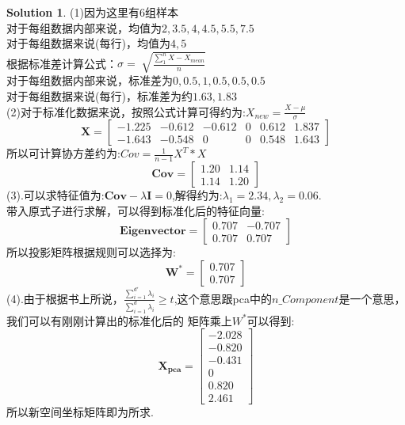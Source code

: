 \documentclass[a4paper,UTF8]{article}
\numberwithin{equation}{section}
\theoremstyle{definition}
\newtheorem*{solution}{Solution}
\def \X {\mathbf{X}}
\begin{document}
\begin{solution} 
    (1)因为这里有6组样本\\
    对于每组数据内部来说，均值为$2,3.5,4,4.5,5.5,7.5$\\
    对于每组数据来说(每行)，均值为$4,5$\\
    根据标准差计算公式：$\sigma = \sqrt[]{\frac{\sum_{1}^{n}X - X_{mean}}{n}}$\\
    对于每组数据内部来说，标准差为$0,0.5,1,0.5,0.5,0.5$\\
    对于每组数据来说(每行)，标准差为约$1.63,1.83$\\
    (2)对于标准化数据来说，按照公式计算可得约为:$X_{new} = \frac{X - \mu}{\sigma}$\\
    \[
        \X = \begin{bmatrix}
            -1.225&-0.612&-0.612&0&0.612&1.837\\
            -1.643&-0.548&0&0&0.548&1.643
        \end{bmatrix}
    \]
    所以可计算协方差约为:$Cov = \frac{1}{n-1} X^T *X$\\
    \[
        \mathbf{Cov} = \begin{bmatrix}
            1.20&1.14\\
            1.14&1.20
        \end{bmatrix}
    \]
    (3).可以求特征值为:$\mathbf{Cov} - \lambda \mathbf{I} = 0$,解得约为:$\lambda_1 = 2.34, \lambda_2 = 0.06$.\\
    带入原式子进行求解，可以得到标准化后的特征向量:\\
    \[
        \mathbf{Eigenvector} = \begin{bmatrix}
            0.707&-0.707\\
            0.707&0.707
        \end{bmatrix}
    \]
    所以投影矩阵根据规则可以选择为:\\
    \[
        \mathbf{W^*} = \begin{bmatrix}
            0.707\\
            0.707
        \end{bmatrix}
    \]
    (4).由于根据书上所说，$\frac{\sum_{i=1}^{d'}\lambda_i}{\sum_{i=1}^{d}\lambda_i} \geq t$,这个意思跟pca中的$n\_Component$是一个意思，我们可以有刚刚计算出的标准化后的
    矩阵乘上$W^*$可以得到:\\
    \[
        \mathbf{X_{pca}} = \begin{bmatrix}
            -2.028\\
            -0.820\\
            -0.431\\
            0\\
            0.820\\
            2.461
        \end{bmatrix}
    \]
    所以新空间坐标矩阵即为所求.
\end{solution}
\end{document}
